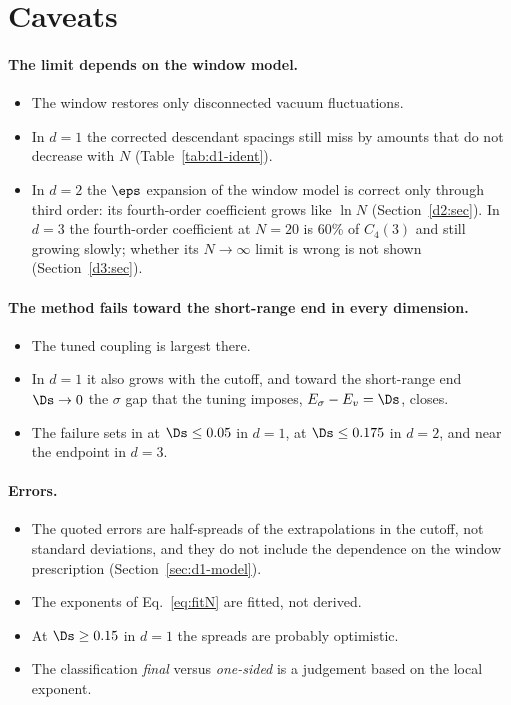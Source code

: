 \section{Caveats}\label{sec:caveats}

\paragraph{The limit depends on the window model.}
\begin{itemize}
\item The window restores only disconnected vacuum fluctuations.
\item In $d=1$ the corrected descendant spacings still miss by amounts that do not decrease with $N$
 (Table~\ref{tab:d1-ident}).
\item In $d=2$ the $\eps$ expansion of the window model is correct only through third order: its fourth-order
 coefficient grows like $\ln N$ (Section~\ref{d2:sec}). In $d=3$ the fourth-order coefficient at $N=20$ is 60\% of
 $C_4(3)$ and still growing slowly; whether its $N\to\infty$ limit is wrong is not shown (Section~\ref{d3:sec}).
\end{itemize}

\paragraph{The method fails toward the short-range end in every dimension.}
\begin{itemize}
\item The tuned coupling is largest there.
\item In $d=1$ it also grows with the cutoff, and toward the short-range end $\Ds\to0$ the $\sigma$ gap that the
 tuning imposes, $E_\sigma-E_v=\Ds$, closes.
\item The failure sets in at $\Ds\le0.05$ in $d=1$, at $\Ds\le0.175$ in $d=2$, and near the endpoint in $d=3$.
\end{itemize}

\paragraph{Errors.}
\begin{itemize}
\item The quoted errors are half-spreads of the extrapolations in the cutoff, not standard deviations, and they do
 not include the dependence on the window prescription (Section~\ref{sec:d1-model}).
\item The exponents of Eq.~\eqref{eq:fitN} are fitted, not derived.
\item At $\Ds\ge0.15$ in $d=1$ the spreads are probably optimistic.
\item The classification \emph{final} versus \emph{one-sided} is a judgement based on the local exponent.
\end{itemize}

